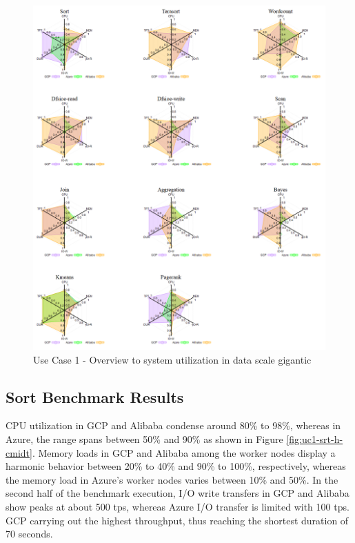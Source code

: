 \documentclass[review]{elsarticle}
\begin{document}
	\begin{figure}[p]
		\caption{Use Case 1 - Overview to system utilization in data scale gigantic}
		\label{fig:uc1-gigantic-new}
		\includegraphics[width=\textwidth]{uc1-gigantic-new}
		\centering
	\end{figure}
	
	
	\subsection{Sort Benchmark Results}
	CPU utilization in GCP and Alibaba condense around 80\% to 98\%, whereas in Azure, the range spans between 50\% and 90\% as shown in Figure \ref{fig:uc1-srt-h-cmidt}. Memory loads in GCP and Alibaba among the worker nodes display a harmonic behavior between 20\% to 40\% and 90\% to 100\%, respectively, whereas the memory load in Azure's worker nodes varies between 10\% and 50\%. In the second half of the benchmark execution, I/O write transfers in GCP and Alibaba show peaks at about 500 tps, whereas Azure I/O transfer is limited with 100 tps. GCP carrying out the highest throughput, thus reaching the shortest duration of 70 seconds.
	
\end{document}
